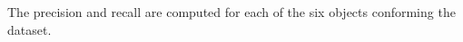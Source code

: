 		The precision and recall are computed for each of the six objects conforming the dataset. 









